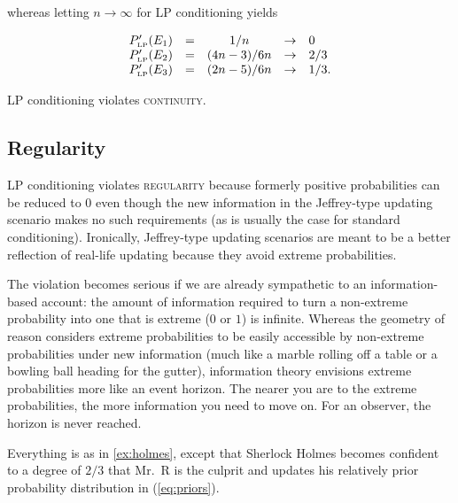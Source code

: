 \documentclass[12pt]{article}
\begin{document}
whereas letting $n\rightarrow\infty$ for LP conditioning yields

\begin{equation}
  \label{eq:sherlockcontlp}
  \begin{array}{rcccl}
  P'_{\mbox{\tiny LP}}(E_{1})&=&1/n&\rightarrow&0\\
  P'_{\mbox{\tiny LP}}(E_{2})&=&(4n-3)/6n&\rightarrow&2/3\\
  P'_{\mbox{\tiny LP}}(E_{3})&=&(2n-5)/6n&\rightarrow&1/3.
\end{array}
\end{equation}

LP conditioning violates \textsc{continuity}.

\subsection{Regularity}
\label{Regularity}

LP conditioning violates \textsc{regularity} because formerly positive
probabilities can be reduced to $0$ even though the new information in
the Jeffrey-type updating scenario makes no such requirements (as is
usually the case for standard conditioning). Ironically, Jeffrey-type
updating scenarios are meant to be a better reflection of real-life
updating because they avoid extreme probabilities. 

The violation becomes serious if we are already sympathetic to an
infor\-ma\-tion-based account: the amount of information required to turn
a non-extreme probability into one that is extreme ($0$ or $1$) is
infinite. Whereas the geometry of reason considers extreme
probabilities to be easily accessible by non-extreme probabilities
under new information (much like a marble rolling off a table or a
bowling ball heading for the gutter), information theory envisions
extreme probabilities more like an event horizon. The nearer you are
to the extreme probabilities, the more information you need to move
on. For an observer, the horizon is never reached.

\begin{quotex}
  \label{ex:regularity} Everything is as
  in {\xample} \ref{ex:holmes}, except that Sherlock Holmes becomes
  confident to a degree of $2/3$ that Mr.\ R is the culprit and
  updates his relatively prior probability distribution in
  (\ref{eq:priors}).
\end{quotex}
\end{document}
